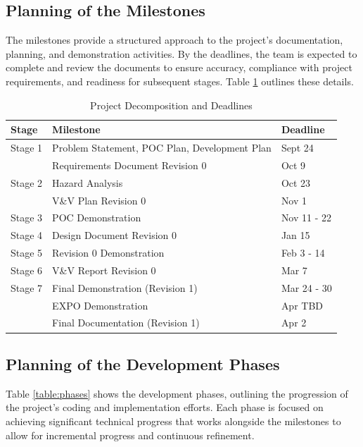 \documentclass[12pt]{article}
\begin{document}
\subsection{Planning of the Milestones}

The milestones provide a structured approach to the project's documentation,
planning, and demonstration activities. By the deadlines, the team is expected
to complete and review the documents to ensure accuracy, compliance with project
requirements, and readiness for subsequent stages. Table \ref{table:milestones} outlines
these details.

\begin{table}[htbp]
  \centering
  \begin{tabular}{|l|l|l|}
  \hline
  \textbf{Stage} & \textbf{Milestone} & \textbf{Deadline} \\
  \hline
  Stage 1 & Problem Statement, POC Plan, Development Plan & Sept 24 \\
  \texttt{} & Requirements Document Revision 0 & Oct 9 \\
  \hline
  Stage 2 & Hazard Analysis & Oct 23 \\
  \texttt{} & V\&V Plan Revision 0 & Nov 1 \\
  \hline
  Stage 3 & POC Demonstration & Nov 11 - 22 \\
  \hline
  Stage 4 & Design Document Revision 0 & Jan 15 \\
  \hline
  Stage 5 & Revision 0 Demonstration & Feb 3 - 14\\
  \hline
  Stage 6 & V\&V Report Revision 0 & Mar 7 \\
  \hline
  Stage 7 & Final Demonstration (Revision 1) & Mar 24 - 30\\
  \texttt{} & EXPO Demonstration & Apr TBD \\
  \texttt{} & Final Documentation (Revision 1) & Apr 2 \\
  \hline
  \end{tabular}
  \caption{Project Decomposition and Deadlines}
  \label{table:milestones}
\end{table}

\subsection{Planning of the Development Phases}

Table \ref{table:phases} shows the development phases, outlining the progression of the project's coding and
implementation efforts. Each phase is focused on achieving significant technical
progress that works alongside the milestones to allow for incremental progress
and continuous refinement.
\end{document}
